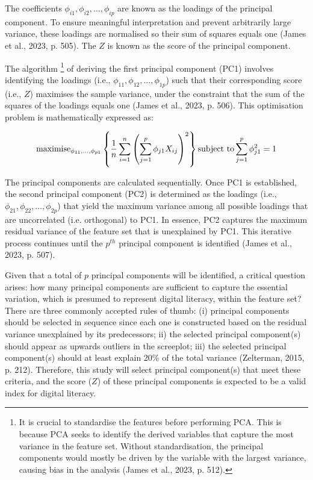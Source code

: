 The coefficients $\phi_{i1}, \phi_{i2}, \ldots, \phi_{ip}$ are known as the loadings of the principal component. To ensure meaningful interpretation and prevent arbitrarily large variance, these loadings are normalised so their sum of squares equals one (James et al., 2023, p. 505). The $Z$ is known as the score of the principal component.

The algorithm \footnote{It is crucial to standardise the features before performing PCA. This is because PCA seeks to identify the derived variables that capture the most variance in the feature set. Without standardisation, the principal components would mostly be driven by the variable with the largest variance, causing bias in the analysis (James et al., 2023, p. 512).} of deriving the first principal component (PC1) involves identifying the loadings (i.e., $\phi_{11}, \phi_{12}, \ldots, \phi_{1p}$) such that their corresponding score (i.e., $Z$) maximises the sample variance, under the constraint that the sum of the squares of the loadings equals one (James et al., 2023, p. 506). This optimisation problem is mathematically expressed as: 

\begin{equation}
    \label{eq:pca_algorithm}
    \textnormal{maximise}_{\phi_{11}, \ldots, \phi_{p1}} \left\{ \frac{1}{n} \sum_{i=1}^{n} \left( \sum_{j=1}^{p} \phi_{j1} X_{ij} \right)^2 \right\} \textnormal{subject to} \sum_{j=1}^{p} \phi_{j1}^2 = 1
\end{equation}

The principal components are calculated sequentially. Once PC1 is established, the second principal component (PC2) is determined as the loadings (i.e., $\phi_{21}, \phi_{22}, \ldots, \phi_{2p}$) that yield the maximum variance among all possible loadings that are uncorrelated (i.e. orthogonal) to PC1. In essence, PC2 captures the maximum residual variance of the feature set that is unexplained by PC1. This iterative process continues until the $p^{th}$ principal component is identified (James et al., 2023, p. 507).

Given that a total of $p$ principal components will be identified, a critical question arises: how many principal components are sufficient to capture the essential variation, which is presumed to represent digital literacy, within the feature set? There are three commonly accepted rules of thumb: (i) principal components should be selected in sequence since each one is constructed based on the residual variance unexplained by its predecessors; ii) the selected principal component(s) should appear as upwards outliers in the screeplot; iii) the selected principal component(s) should at least explain 20\% of the total variance (Zelterman, 2015, p. 212). Therefore, this study will select principal component(s) that meet these criteria, and the score ($Z$) of these principal components is expected to be a valid index for digital literacy.

